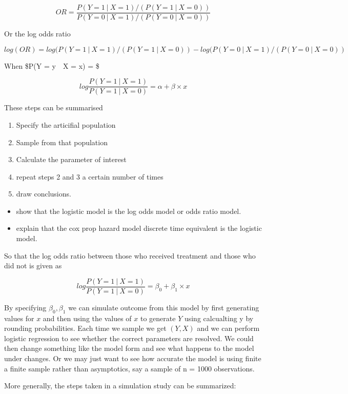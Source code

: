 \documentclass[11pt]{article}
\providecommand{\tightlist}{%
      \setlength{\itemsep}{0pt}\setlength{\parskip}{0pt}}
\begin{document}
\[OR = \frac{P(Y = 1\ |\ X = 1)/(P(Y = 1\ |\ X = 0))}{P(Y = 0\ |\ X = 1)/(P(Y = 0\ |\ X = 0))}\]

Or the log odds ratio

\[log(OR) = log(P(Y = 1\ |\ X = 1)/(P(Y = 1\ |\ X = 0)) - log(P(Y = 0\ |\ X = 1)/(P(Y = 0\ |\ X = 0))\]

When \$P(Y = y~\textbar{}~X = x) = \$

\[log \frac{P(Y = 1\ |\ X = 1)}{P(Y = 1\ |\ X = 0)} = \alpha + \beta \times x\]

These steps can be summarised

\begin{enumerate}
\def\labelenumi{\arabic{enumi}.}
\tightlist
\item
  Specify the articifial population
\item
  Sample from that population
\item
  Calculate the parameter of interest
\item
  repeat steps 2 and 3 a certain number of times
\item
  draw conclusions.
\end{enumerate}

\begin{itemize}
\tightlist
\item
  show that the logistic model is the log odds model or odds ratio
  model.
\item
  explain that the cox prop hazard model discrete time equivalent is the
  logistic model.
\end{itemize}

So that the log odds ratio between those who received treatment and
those who did not is given as

\[log \frac{P(Y = 1\ |\ X = 1)}{P(Y = 1\ |\ X = 0)} = \beta_0 + \beta_1 \times x \]

By specifying \({\beta_0, \beta_1}\) we can simulate outcome from this
model by first generating values for \(x\) and then using the values of
\(x\) to generate \(Y\) using calcualting y by rounding probabilities.
Each time we sample we get \((Y, X)\) and we can perform logistic
regression to see whether the correct parameters are resolved. We could
then change something like the model form and see what happens to the
model under changes. Or we may just want to see how accurate the model
is using finite a finite sample rather than asymptotics, say a sample of
n = 1000 observations.

More generally, the steps taken in a simulation study can be summarized:
\end{document}
